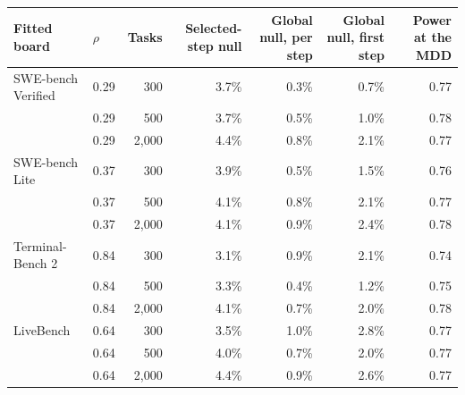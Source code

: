 \begin{tabular}{llrrrrr}
\toprule
Fitted board & $\rho$ & Tasks & Selected-step null & Global null, per step & Global null, first step & Power at the MDD \\
\midrule
SWE-bench Verified & 0.29 & 300 & 3.7\% & 0.3\% & 0.7\% & 0.77 \\
 & 0.29 & 500 & 3.7\% & 0.5\% & 1.0\% & 0.78 \\
 & 0.29 & 2,000 & 4.4\% & 0.8\% & 2.1\% & 0.77 \\
SWE-bench Lite & 0.37 & 300 & 3.9\% & 0.5\% & 1.5\% & 0.76 \\
 & 0.37 & 500 & 4.1\% & 0.8\% & 2.1\% & 0.77 \\
 & 0.37 & 2,000 & 4.1\% & 0.9\% & 2.4\% & 0.78 \\
Terminal-Bench 2 & 0.84 & 300 & 3.1\% & 0.9\% & 2.1\% & 0.74 \\
 & 0.84 & 500 & 3.3\% & 0.4\% & 1.2\% & 0.75 \\
 & 0.84 & 2,000 & 4.1\% & 0.7\% & 2.0\% & 0.78 \\
LiveBench & 0.64 & 300 & 3.5\% & 1.0\% & 2.8\% & 0.77 \\
 & 0.64 & 500 & 4.0\% & 0.7\% & 2.0\% & 0.77 \\
 & 0.64 & 2,000 & 4.4\% & 0.9\% & 2.6\% & 0.77 \\
\bottomrule
\end{tabular}
